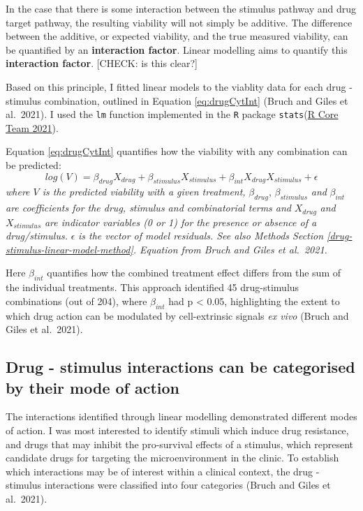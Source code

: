 \documentclass[11pt, a4paper, twosided]{book}
\begin{document}
In the case that there is some interaction between the stimulus pathway and drug target pathway, the resulting viability will not simply be additive. The difference between the additive, or expected viability, and the true measured viability, can be quantified by an \textbf{interaction factor}. Linear modelling aims to quantify this \textbf{interaction factor}. {[}CHECK: is this clear?{]}

Based on this principle, I fitted linear models to the viablity data for each drug - stimulus combination, outlined in Equation \eqref{eq:drugCytInt} (Bruch and Giles et al.~2021). I used the \texttt{lm} function implemented in the \texttt{R} package \texttt{stats}(\protect\hyperlink{ref-R-base}{R Core Team 2021}).

Equation \eqref{eq:drugCytInt} quantifies how the viability with any combination can be predicted:
\begin{equation}
            log(V) = \beta_{drug}X_{drug} + \beta_{stimulus}X_{stimulus} + \beta_{int}X_{drug}X_{stimulus} + \epsilon
                                       \label{eq:drugCytInt}
    \end{equation}
\emph{where \(V\) is the predicted viability with a given treatment,} \(\beta_{drug}\), \(\beta_{stimulus}\) \emph{and} \(\beta_{int}\) \emph{are coefficients for the drug, stimulus and combinatorial terms and} \(X_{drug}\) \emph{and} \(X_{stimulus}\) \emph{are indicator variables (0 or 1) for the presence or absence of a drug/stimulus.} \(\epsilon\) \emph{is the vector of model residuals. See also Methods Section \ref{drug-stimulus-linear-model-method}. Equation from Bruch and Giles et al.~2021.}

Here \(\beta_{int}\) quantifies how the combined treatment effect differs from the sum of the individual treatments. This approach identified 45 drug-stimulus combinations (out of 204), where \(\beta_{int}\) had p \textless{} 0.05, highlighting the extent to which drug action can be modulated by cell-extrinsic signals \emph{ex vivo} (Bruch and Giles et al.~2021).

\hypertarget{drug-stimulus-categories}{%
\subsection{Drug - stimulus interactions can be categorised by their mode of action}\label{drug-stimulus-categories}}

The interactions identified through linear modelling demonstrated different modes of action. I was most interested to identify stimuli which induce drug resistance, and drugs that may inhibit the pro-survival effects of a stimulus, which represent candidate drugs for targeting the microenvironment in the clinic. To establish which interactions may be of interest within a clinical context, the drug - stimulus interactions were classified into four categories (Bruch and Giles et al.~2021).
\end{document}

